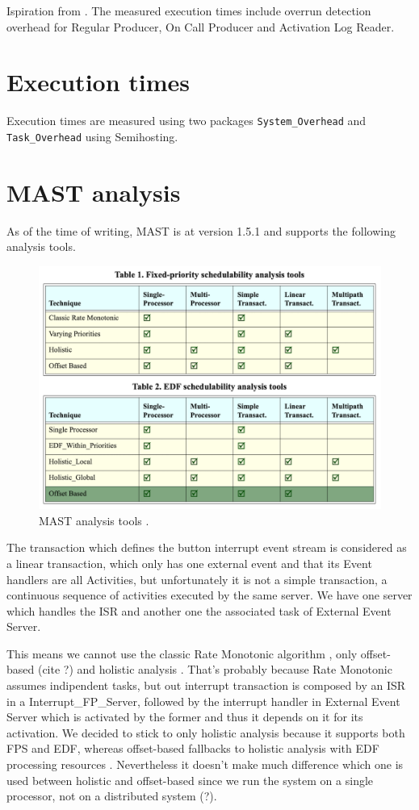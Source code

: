 \documentclass{article}
\begin{document}
Ispiration from \cite{overrundetection}. The measured execution times include overrun detection overhead for Regular Producer, On Call Producer and Activation Log Reader.

\section{Execution times}

Execution times are measured using two packages \texttt{System\_Overhead} and \texttt{Task\_Overhead} using Semihosting.

\section{MAST analysis}

As of the time of writing, MAST is at version 1.5.1 and supports the following analysis tools.

\begin{figure}[!htbp]
\centering
\includegraphics[width=5in]{images/mast-analysis}
\caption{MAST analysis tools \cite{mast-description}.}
\label{mast-analysis-tools}
\end{figure}

The transaction which defines the button interrupt event stream is considered as a linear transaction, which only has one external event and that its Event handlers are all Activities, but unfortunately it is not a simple transaction, a continuous sequence of activities executed by the same server. We have one server which handles the ISR and another one the associated task of External Event Server.

This means we cannot use the classic Rate Monotonic algorithm \cite{rm-dm}, only offset-based (cite ?) and holistic analysis \cite{holistic-analysis}. That's probably because Rate Monotonic assumes indipendent tasks, but out interrupt transaction is composed by an ISR in a Interrupt\_FP\_Server, followed by the interrupt handler in External Event Server which is activated by the former and thus it depends on it for its activation. We decided to stick to only holistic analysis because it supports both FPS and EDF, whereas offset-based fallbacks to holistic analysis with EDF processing resources \cite{mast-readme}. Nevertheless it doesn't make much difference which one is used between holistic and offset-based since we run the system on a single processor, not on a distributed system (?).
\end{document}

